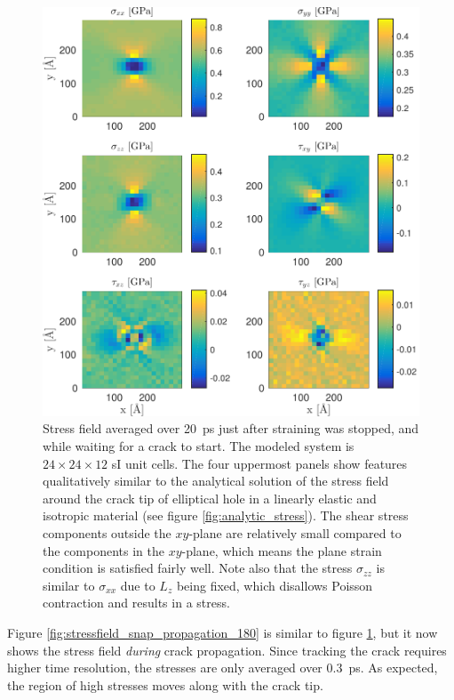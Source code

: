 \begin{figure}
\centering
\includegraphics[width=\textwidth]{../figures/thesis/stressfield_avg_wait_for_crack.pdf}
\caption{Stress field averaged over \SI{20}{\pico\second} just after straining was stopped, and while waiting for a crack to start. The modeled system is $24\times 24\times 12$ sI unit cells. The four uppermost panels show features qualitatively similar to the analytical solution of the stress field around the crack tip of elliptical hole in a linearly elastic and isotropic material (see figure \ref{fig:analytic_stress}). The shear stress components outside the $xy$-plane are relatively small compared to the components in the $xy$-plane, which means the plane strain condition is satisfied fairly well. Note also that the stress $\sigma_{zz}$ is similar to $\sigma_{xx}$ due to $L_z$ being fixed, which disallows Poisson contraction and results in a stress.}
\label{fig:stressfield_avg_wait_for_crack}
\end{figure}

Figure \ref{fig:stressfield_snap_propagation_180} is similar to figure \ref{fig:stressfield_avg_wait_for_crack}, but it now shows the stress field \emph{during} crack propagation. Since tracking the crack requires higher time resolution, the stresses are only averaged over \SI{0.3}{\pico\second}. As expected, the region of high stresses moves along with the crack tip.

